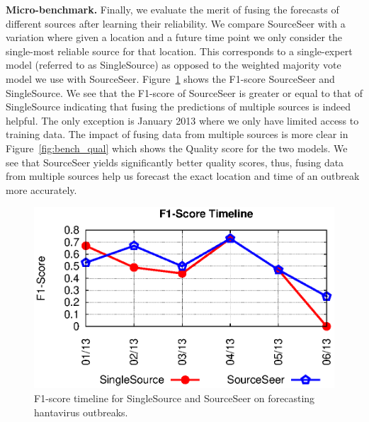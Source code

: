 \documentclass[twoside,leqno,twocolumn]{article}
\newcommand{\fullmodel}{{{\sf SourceSeer}}\xspace}
\newcommand{\fullsingle}{{{\sf SingleSource}}\xspace}
\begin{document}
\vspace{2pt}\textbf{Micro-benchmark.} Finally, we evaluate the merit of fusing the forecasts of different sources after learning their reliability. We compare \fullmodel with a variation where given a location and a future time point we only consider the single-most reliable source for that location. This corresponds to a single-expert model (referred to as \fullsingle) as opposed to the weighted majority vote model we use with \fullmodel. Figure~\ref{fig:bench_f1} shows the F1-score \fullmodel and \fullsingle.  We see that the F1-score of \fullmodel is greater or equal to that of \fullsingle indicating that fusing the predictions of multiple sources is indeed helpful. The only exception is January 2013 where we only have limited access to training data. The impact of fusing data from multiple sources is more clear in Figure~\ref{fig:bench_qual} which shows the Quality score for the two models. We see that \fullmodel yields significantly better quality scores, thus, fusing data from multiple sources help us forecast the exact location and time of an outbreak more accurately.

\begin{figure}[h]
\begin{center}
	\includegraphics[clip,scale=0.6]{fig/f1_bench.eps}
\end{center}
\caption{F1-score timeline for \fullsingle and \fullmodel on forecasting hantavirus outbreaks.}
 \label{fig:bench_f1}
\end{figure}
\end{document}
